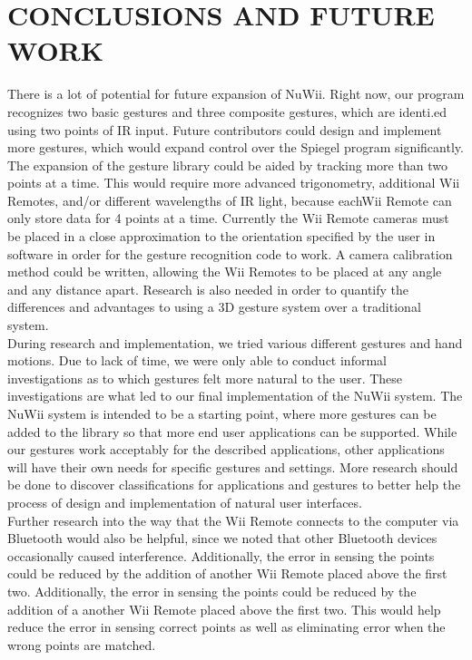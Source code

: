 \documentclass[a4paper,twoside]{article}
\begin{document}
\section{\uppercase{Conclusions and Future Work}} There is a lot of potential
for future expansion of NuWii. Right now, our program recognizes two basic
gestures and three composite gestures, which are identi.ed using two points of
IR input. Future contributors could design and implement more gestures, which
would expand control over the Spiegel program significantly. The expansion of
the gesture library could be aided by tracking more than two points at a time.
This would require more advanced trigonometry, additional Wii Remotes, and/or
different wavelengths of IR light, because eachWii Remote can only store data
for 4 points at a time. Currently the Wii Remote cameras must be placed in a
close approximation to the orientation specified by the user in software in
order for the gesture recognition code to work. A camera calibration method
could be written, allowing the Wii Remotes to be placed at any angle and any
distance apart.  Research is also needed in order to quantify the differences
and advantages to using a 3D gesture system over a traditional system. \\
During research and implementation, we tried various different gestures and
hand motions. Due to lack of time, we were only able to conduct informal
investigations as to which gestures felt more natural to the user. These
investigations are what led to our final implementation of the NuWii system.
The NuWii system is intended to be a starting point, where more gestures can be
added to the library so that more end user applications can be supported. While
our gestures work acceptably for the described applications, other applications
will have their own needs for specific gestures and settings. More research
should be done to discover classifications for applications and gestures to
better help the process of design and implementation of natural user
interfaces.\\ Further research into the way that the Wii Remote connects to the
computer via Bluetooth would also be helpful, since we noted that other
Bluetooth devices occasionally caused interference. Additionally, the error in
sensing the points could be reduced by the addition of another Wii Remote
placed above the first two. Additionally, the error in sensing the points could
be reduced by the addition of a another Wii Remote placed above the first two.
This would help reduce the error in sensing correct points as well as
eliminating error when the wrong points are matched.\\
 
\end{document}
